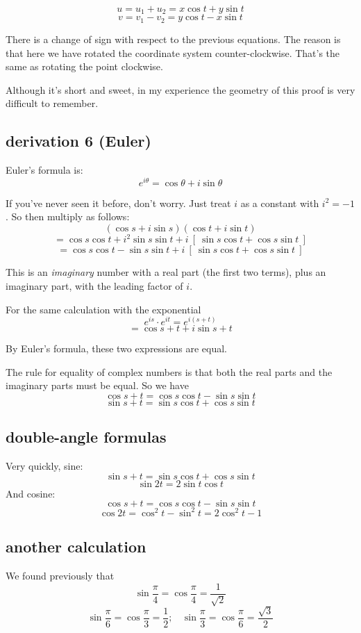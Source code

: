 \documentclass[11pt, oneside]{article}
\begin{document}
\[ u = u_1 + u_2 = x \cos t + y \sin t \]
\[ v = v_1 - v_2 = y \cos t - x \sin t  \]

There is a change of sign with respect to the previous equations.  The reason is that here we have rotated the coordinate system counter-clockwise.  That's the same as rotating the point clockwise.

Although it's short and sweet, in my experience the geometry of this proof is very difficult to remember.

\subsection*{derivation 6 (Euler)}
Euler's formula is:
\[ e^{i \theta} = \cos \theta + i \sin \theta \]

If you've never seen it before, don't worry.  Just treat $i$ as a constant with $i^2 = -1$.  So then multiply as follows:
\[ (\cos s + i \sin s)(\cos t + i \sin t) \]
\[ = \cos s \cos t + i^2 \sin s \sin t + i \ [ \ \sin s \cos t + \cos s \sin t \ ] \] 
\[ = \cos s \cos t - \sin s \sin t + i \ [ \ \sin s \cos t + \cos s \sin t \ ] \] 

This is an \emph{imaginary} number with a real part (the first two terms), plus an imaginary part, with the leading factor of $i$.

For the same calculation with the exponential
\[ e^{is} \cdot e^{it} = e^{i(s+t)} \]
\[ = \cos s + t + i \sin s + t \]

By Euler's formula, these two expressions are equal.  

The rule for equality of complex numbers is that both the real parts and the imaginary parts must be equal.  So we have
\[ \cos s + t = \cos s \cos t - \sin s \sin t \]
\[ \sin s + t = \sin s \cos t + \cos s \sin t \]

\subsection*{double-angle formulas}
Very quickly, sine:
\[ \sin s + t = \sin s \cos t + \cos s \sin t \]
\[ \sin 2t = 2 \sin t \cos t \]
And cosine:
\[ \cos s + t = \cos s \cos t - \sin s \sin t \]
\[ \cos 2t = \cos^2 t - \sin^2 t = 2 \cos^2 t - 1 \]

\subsection*{another calculation}
We found previously that 
\[ \sin \frac{\pi}{4} = \cos \frac{\pi}{4} = \frac{1}{\sqrt{2}} \]
\[ \sin \frac{\pi}{6} = \cos \frac{\pi}{3} = \frac{1}{2}; \ \ \ \ \sin \frac{\pi}{3} = \cos \frac{\pi}{6} = \frac{\sqrt{3}}{2} \]
\end{document}
